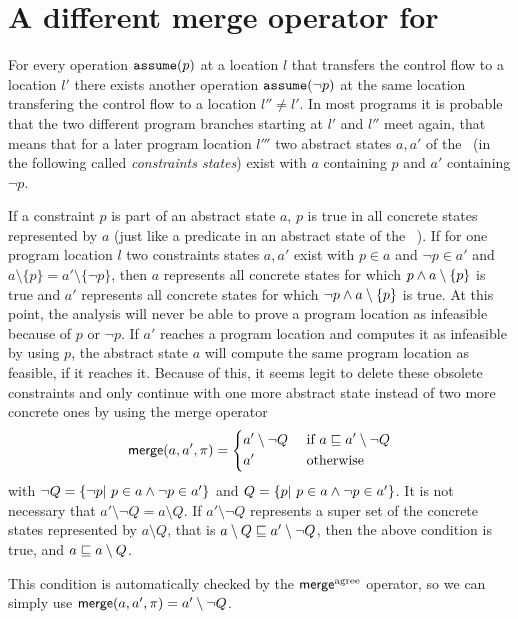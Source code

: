 \section{A different merge operator for \constraintsCPA}
\label{sec:newMerge}
For every operation $\texttt{assume}(p)$ at a location $l$ that transfers the control flow to a location $l'$ there exists another operation $\texttt{assume}(\neg p)$ at the same location transfering the control flow to a location $l'' \neq l'$.
In most programs it is probable that the two different program branches starting at $l'$ and $l''$ meet again, that means that for a later program location $l'''$ two abstract states $a, a'$ of the \constraintsCPA\ (in the following  called \emph{constraints states}) exist with $a$ containing $p$ and $a'$ containing $\neg p$.

If a constraint $p$ is part of an abstract state $a$, $p$ is true in all concrete states represented by $a$ (just like a predicate in an abstract state of the \predicateCPA\ \cite{Beyer2008}).
If for one program location $l$ two constraints states $a, a'$ exist with $p \in a$ and $\neg p \in a'$ and $a \setminus \{ p \} = a' \setminus \{ \neg p \}$,
then $a$ represents all concrete states for which $p \wedge a \setminus \{ p \}$ is true and $a'$ represents all concrete states for which $\neg p \wedge a \setminus \{ p \}$ is true.
At this point, the analysis will never be able to prove a program location as infeasible because of $p$ or $\neg p$.
If $a'$ reaches a program location and computes it as infeasible by using $p$, the abstract state $a$ will compute the same program location as feasible, if it reaches it.
Because of this, it seems legit to delete these obsolete constraints and only continue with one more abstract state instead of two more concrete ones by using the merge operator
\[ \operatorname{\operatorname{\mathsf{merge}}} (a, a', \pi) = \begin{dcases}
a' \setminus \neg Q & \text{ if } a \sqsubseteq a' \setminus \neg Q \\
a' & \text{ otherwise}
\end{dcases} \]
with $\neg Q = \{\neg p |\ p \in a \wedge \neg p \in a' \}$ and $Q = \{ p |\ p \in a \wedge \neg p \in a' \}$.
It is not necessary that $a' \setminus \neg Q = a \setminus Q$.
If $a' \setminus \neg Q$ represents a super set of the concrete states represented by $a \setminus Q$, that is $a \setminus Q \sqsubseteq a' \setminus \neg Q$, then the above condition is true, and $a \sqsubseteq a \setminus Q$.

This condition is automatically checked by the $\operatorname{{\operatorname{\operatorname{\mathsf{merge}}}^{agree}}}$ operator, so we can simply use $\operatorname{\operatorname{\mathsf{merge}}}(a, a', \pi) = a' \setminus \neg Q$.
